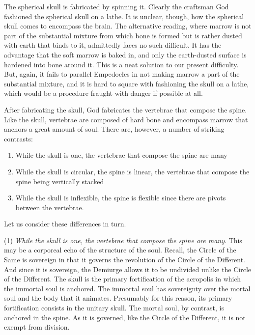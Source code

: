 The spherical skull is fabricated by spinning it. Clearly the craftsman God fashioned the spherical skull on a lathe. It is unclear, though, how the spherical skull comes to encompass the brain. The alternative reading, where marrow is not part of the substantial mixture from which bone is formed but is rather dusted with earth that binds to it, admittedly faces no such difficult. It has the advantage that the soft marrow is baked in, and only the earth-dusted surface is hardened into bone around it. This is a neat solution to our present difficulty. But, again, it fails to parallel Empedocles in not making marrow a part of the substantial mixture, and it is hard to square with fashioning the skull on a lathe, which would be a procedure fraught with danger if possible at all.

After fabricating the skull, God fabricates the vertebrae that compose the spine. Like the skull, vertebrae are composed of hard bone and encompass marrow that anchors a great amount of soul. There are, however, a number of striking contrasts:
\begin{enumerate}[(1)]
	\item While the skull is one, the vertebrae that compose the spine are many
	\item While the skull is circular, the spine is linear, the vertebrae that compose the spine being vertically stacked
	\item While the skull is inflexible, the spine is flexible since there are pivots between the vertebrae.
\end{enumerate}
Let us consider these differences in turn.

(1) \emph{While the skull is one, the vertebrae that compose the spine are many}. This may be a corporeal echo of the structure of the soul. Recall, the Circle of the Same is sovereign in that it governs the revolution of the Circle of the Different. And since it is sovereign, the Demiurge allows it to be undivided unlike the Circle of the Different. The skull is the primary fortification of the acropolis in which the immortal soul is anchored. The immortal soul has sovereignty over the mortal soul and the body that it animates. Presumably for this reason, its primary fortification consists in the unitary skull. The mortal soul, by contrast, is anchored in the spine. As it is governed, like the Circle of the Different, it is not exempt from division.

